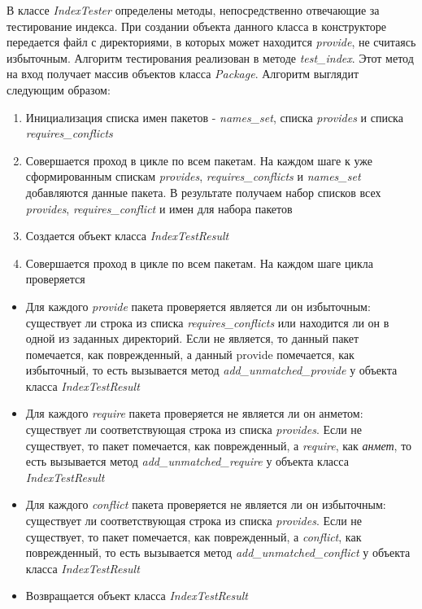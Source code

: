 В классе \textit{IndexTester} определены методы, непосредственно отвечающие за тестирование
индекса. При создании объекта данного класса в конструкторе передается файл с директориями,
в которых может находится \textit{provide}, не считаясь избыточным. 
Алгоритм тестирования реализован в методе \textit{test\_index}. Этот метод на вход
получает массив объектов класса \textit{Package}. Алгоритм выглядит следующим образом:
\begin{enumerate}
\item{Инициализация списка имен пакетов - \textit{names\_set}, списка \textit{provides} и 
списка \textit{requires\_conflicts}}
\item{Совершается проход в цикле по всем пакетам. На каждом шаге 
к уже сформированным спискам \textit{provides}, \textit{requires\_conflicts} и \textit{names\_set} 
добавляются данные пакета. В результате получаем набор списков всех \textit{provides}, 
\textit{requires\_conflict} и имен для набора пакетов}
\item{Создается объект класса \textit{IndexTestResult}}
\item{Совершается проход в цикле по всем пакетам. На каждом шаге цикла проверяется}
\end{enumerate}
\begin{itemize}
\item{Для каждого \textit{provide} пакета проверяется является ли он избыточным: существует ли
строка из списка \textit{requires\_conflicts} или находится ли он в одной из заданных директорий.
Если не является, то данный пакет помечается, как поврежденный, а данный provide помечается,
как избыточный, то есть вызывается метод \emph{add\_unmatched\_provide} у объекта класса \textit{IndexTestResult}}
\item{Для каждого \textit{require} пакета проверяется не является ли он анметом: существует ли
соответствующая строка из списка \textit{provides}. Если не существует, то пакет помечается, как 
поврежденный, а \textit{require}, как \textit{анмет}, то есть вызывается метод \textit{add\_unmatched\_require}
у объекта класса \textit{IndexTestResult}}
\item{Для каждого \textit{conflict} пакета проверяется не является ли он избыточным: существует ли
соответствующая строка из списка \textit{provides}. Если не существует, то пакет помечается, как 
поврежденный, а \textit{conflict}, как поврежденный, то есть вызывается метод \textit{add\_unmatched\_conflict}
у объекта класса \textit{IndexTestResult}}

\item{Возвращается объект класса \textit{IndexTestResult}}
\end{itemize}

